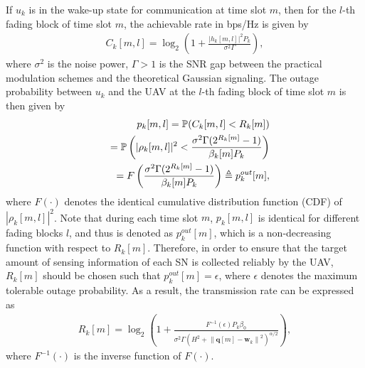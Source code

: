 \documentclass[journal]{IEEEtran}
\newcommand{\norm}[1]{\left\lVert#1\right\rVert}
\begin{document}
If $u_k$ is in the wake-up state for
communication at time slot $m$, then for the $l$-th fading block of time slot $m$, the achievable rate in bps/Hz is given by
\begin{eqnarray}
C_k[m,l]=\log_2{\left(1+\frac{|h_k[m,l]|^2P_k}{\sigma^2\Gamma}\right)},
\end{eqnarray}
where $\sigma^2$ is the noise power, $\Gamma>1$ is the SNR gap between the practical modulation schemes and the theoretical Gaussian signaling. The outage probability
between $u_k$ and the UAV at the $l$-th fading block of time slot $m$ is then given by
\begin{eqnarray}
&&\hspace{-12mm}p_k[m,l]=\mathbb{P}(C_k[m,l]<R_k[m])\nonumber\\
&&=\mathbb{P}\left(|\rho_k[m,l]|^2<\frac{\sigma^2\Gamma(2^{R_k[m]}-1)}{\beta_k[m]P_k}\right)\nonumber\\
&&=F\left(\frac{\sigma^2\Gamma(2^{R_k[m]}-1)}{\beta_k[m]P_k}\right)\triangleq p_k^{out}[m],
\end{eqnarray}
where $F(\cdot)$ denotes the identical cumulative distribution function (CDF) of $|\rho_k[m,l]|^2$. Note that during each time slot $m$, $p_k[m,l]$ is identical for different fading blocks $l$, and thus is denoted as $p_k^{out}[m]$, which is a non-decreasing function with respect to $R_k[m]$. Therefore, in order to ensure that the target amount of sensing information of each SN is collected reliably by the UAV, $R_k[m]$ should be chosen such that $p_k^{out}[m]=\epsilon$, where $\epsilon$ denotes the maximum tolerable outage probability. As a result, the transmission rate can be expressed as
\begin{eqnarray}
R_k[m]=\log_2\left({1+\frac{F^{-1}({\epsilon})P_k\beta_0}{\sigma^2\Gamma(H^2+\norm{\mathbf{q}[m]-\mathbf{w}_k}^2)^{\alpha/2}}}\right),
\end{eqnarray}
where $F^{-1}(\cdot)$ is the inverse function of $F(\cdot)$.
\end{document}
